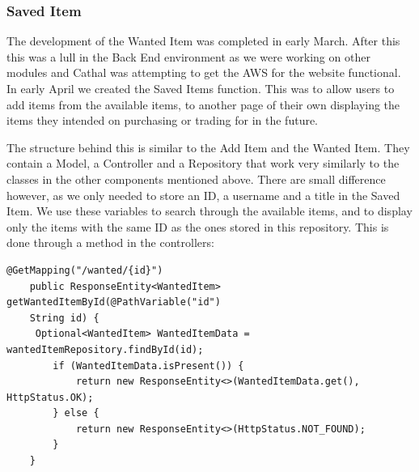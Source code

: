 \subsubsection{Saved Item}
The development of the Wanted Item was completed in early March. After this this was a lull in the Back End environment as we were working on other modules and Cathal was attempting to get the AWS for the website functional. In early April we created the Saved Items function. This was to allow users to add items from the available items, to another page of their own displaying the items they intended on purchasing or trading for in the future. \par
The structure behind this is similar to the Add Item and the Wanted Item. They contain a Model, a Controller and a Repository that work very similarly to the classes in the other components mentioned above. There are small difference however, as we only needed to store an ID, a username and a title in the Saved Item. We use these variables to search through the available items, and to display only the items with the same ID as the ones stored in this repository. This is done through a method in the controllers: \par
\begin{verbatim}
@GetMapping("/wanted/{id}")
    public ResponseEntity<WantedItem> getWantedItemById(@PathVariable("id")
    String id) {
     Optional<WantedItem> WantedItemData = wantedItemRepository.findById(id);
        if (WantedItemData.isPresent()) {
            return new ResponseEntity<>(WantedItemData.get(), HttpStatus.OK);
        } else {
            return new ResponseEntity<>(HttpStatus.NOT_FOUND);
        }
    }
\end{verbatim}

